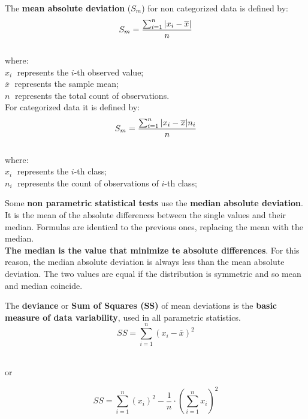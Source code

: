 \begin{frame}
  The \textbf{mean absolute deviation} ($S_m$) for non categorized data is defined by:\\
  $$ S_m = \frac{\sum_{i=1}^n{\lvert x_i-\overline{x}\rvert}}{n} $$ \\
  where:\\
  \hspace*{2cm} $x_i\;$ represents the $i$-th observed value;\\
  \hspace*{2cm} $\overline{x}\;$ represents the sample mean;\\
  \hspace*{2cm} $n\;$ represents the total count of observations.\\
  \vspace*{.15cm}
  For categorized data it is defined by:\\
  $$ S_m = \frac{\sum_{i=1}^n{\lvert x_i-\overline{x}\rvert n_i}}{n} $$ \\
  where:\\
  \hspace*{2cm} $x_i\;$ represents the $i$-th class;\\
  \hspace*{2cm} $n_i\;$ represents the count of observations of $i$-th class;\\
\end{frame}

\begin{frame}
  \vspace*{.5cm}
  Some \textbf{non parametric statistical tests} use the \textbf{median absolute deviation}. It is the mean of the absolute differences between the single values and their median. Formulas are identical to the previous ones, replacing the mean with the median.\\
  \vspace*{.7cm}
  \textbf{The median is the value that minimize te absolute differences}. For this reason, the median absolute deviation is always less than the mean absolute deviation. The two values are equal if the distribution is symmetric and so mean and median coincide.
\end{frame}


\begin{frame}
  \vspace*{.25cm}
  The \textbf{deviance} or \textbf{Sum of Squares (SS)} of mean deviations is the \textbf{basic measure of data variability}, used in all parametric statistics.\\
  \vspace*{.25cm}
  $$ SS = \sum_{i=1}^n{(x_i-\overline{x})^2} $$ \\
  \vspace*{.25cm}
  \begin{center}
    or \\
  \end{center}
  \vspace*{.25cm}
  $$ SS = \sum_{i=1}^n{(x_i)^2}-\frac{1}{n}\cdot\left(\sum_{i=1}^n{x_i}\right)^2 $$ \\
\end{frame}

